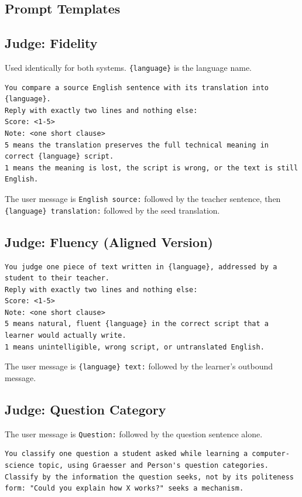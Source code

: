 \documentclass[pdflatex,sn-mathphys-num]{sn-jnl}%
\theoremstyle{thmstyleone}%
\theoremstyle{thmstyletwo}%
\theoremstyle{thmstylethree}%
\begin{document}
\begin{appendices}

\section{Prompt Templates}\label{app:prompts}

\subsection{Judge: Fidelity}
Used identically for both systems. \texttt{\{language\}} is the language name.
\begin{lstlisting}
You compare a source English sentence with its translation into {language}.
Reply with exactly two lines and nothing else:
Score: <1-5>
Note: <one short clause>
5 means the translation preserves the full technical meaning in correct {language} script.
1 means the meaning is lost, the script is wrong, or the text is still English.
\end{lstlisting}
The user message is \texttt{English source:} followed by the teacher sentence, then
\texttt{\{language\} translation:} followed by the seed translation.

\subsection{Judge: Fluency (Aligned Version)}
\begin{lstlisting}
You judge one piece of text written in {language}, addressed by a student to their teacher.
Reply with exactly two lines and nothing else:
Score: <1-5>
Note: <one short clause>
5 means natural, fluent {language} in the correct script that a learner would actually write.
1 means unintelligible, wrong script, or untranslated English.
\end{lstlisting}
The user message is \texttt{\{language\} text:} followed by the learner's outbound message.

\subsection{Judge: Question Category}
The user message is \texttt{Question:} followed by the question sentence alone.
\begin{lstlisting}
You classify one question a student asked while learning a computer-science topic, using Graesser and Person's question categories.
Classify by the information the question seeks, not by its politeness form: "Could you explain how X works?" seeks a mechanism.


\end{lstlisting}
\end{appendices}
\end{document}
